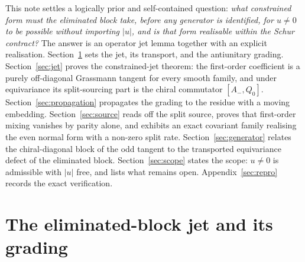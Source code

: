 \documentclass[11pt]{article}
\theoremstyle{definition}
\theoremstyle{remark}
\begin{document}
    This note settles a logically prior and self-contained question: \emph{what constrained form must the eliminated
    block
    take, before any generator is identified, for $u \neq 0$ to be possible without importing $|u|$, and is that form
    realisable within the Schur contract?}
    The answer is an operator jet lemma together with an explicit realisation.
    Section~\ref{sec:setup} sets the jet, its transport, and the antiunitary grading.
    Section~\ref{sec:jet} proves the constrained-jet theorem: the first-order coefficient is a purely off-diagonal
    Grassmann tangent for every smooth family, and under equivariance its split-sourcing part is the chiral commutator
    $[A_-, Q_0]$.
    Section~\ref{sec:propagation} propagates the grading to the residue with a moving embedding.
    Section~\ref{sec:source} reads off the split source, proves that first-order mixing vanishes by parity alone, and
    exhibits an exact covariant family realising the even normal form with a non-zero split rate.
    Section~\ref{sec:generator} relates the chiral-diagonal block of the odd tangent to the transported equivariance
    defect of the eliminated block.
    Section~\ref{sec:scope} states the scope: $u \neq 0$ is admissible with $|u|$ free, and lists what remains open.
    Appendix~\ref{sec:repro} records the exact verification.

  \section{The eliminated-block jet and its grading}
    \label{sec:setup}
\end{document}

